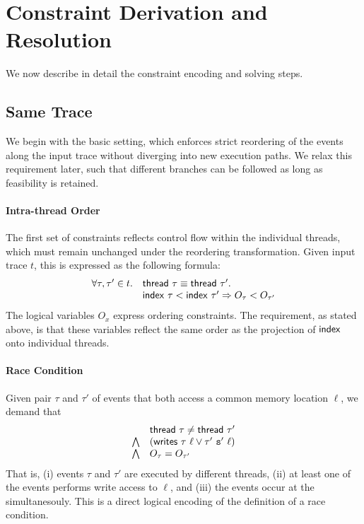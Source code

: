 \section{Constraint Derivation and Resolution}

We now describe in detail the constraint encoding and solving steps.

\subsection{Same Trace}

We begin with the basic setting, which enforces strict reordering of the events along the input trace without diverging into new execution paths. We relax this requirement later, such that different branches can be followed as long as feasibility is retained.

\paragraph{Intra-thread Order}

The first set of constraints reflects control flow within the individual threads, which must remain unchanged under the reordering transformation. Given input trace $t$, this is expressed as the following formula:
$$
\begin{array}{rl}
	\forall \tau,\tau' \in t. & {\sf thread}\ \tau \equiv {\sf thread}\ \tau'. \\
										& {\sf index}\ \tau < {\sf index}\ \tau' \Rightarrow O_{\tau} < O_{\tau'}
\end{array}
$$ 
The logical variables $O_x$ express ordering constraints. The requirement, as stated above, is that these variables
reflect the same order as the projection of ${\sf index}$ onto individual threads.

\paragraph{Race Condition}

Given pair $\tau$ and $\tau'$ of events that both access a common memory location $\ell$, we demand that
$$
\begin{array}{rl}
					& {\sf thread}\ \tau \neq {\sf thread}\ \tau' \\
\bigwedge 	& ({\sf writes}\ \tau\ \ell \vee \tau'\ {\tt s}'\ \ell) \\
\bigwedge   & O_{\tau} = O_{\tau'}
\end{array}
$$
That is, (i) events $\tau$ and $\tau'$ are executed by different threads, (ii) at least one of the events performs write access to $\ell$, and (iii) the events occur at the simultanesouly. This is a direct logical encoding of the definition of a race condition.

